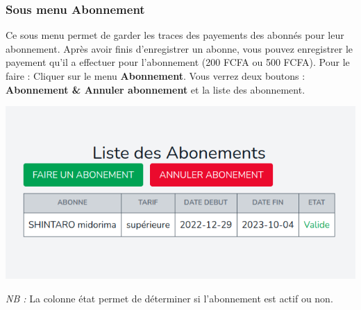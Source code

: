 \documentclass[12pt,a4paper]{article}
\begin{document}
\subsubsection{Sous menu \textbf{Abonnement}}
Ce sous menu permet de garder les traces des payements des abonnés pour leur
abonnement. Après avoir finis d'enregistrer un abonne, vous pouvez enregistrer le 
payement qu'il a effectuer pour l'abonnement (200 FCFA ou 500 FCFA). Pour le faire :
Cliquer sur le menu \textbf{Abonnement}. 
Vous verrez deux boutons : \textbf{Abonnement \& Annuler abonnement} et la liste des abonnement.\\
\begin{center}
\includegraphics[scale=0.56]{img/abonnements.png}
\end{center}
\textit{NB :} La colonne état permet de déterminer si l'abonnement est actif ou non.
\end{document}
